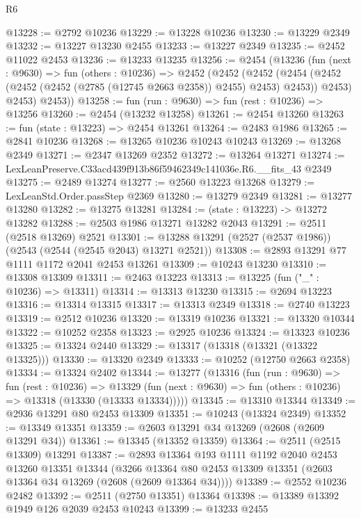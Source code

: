 \begin{lexlean}{R6}
\begin{coremodule}
@13228 := @2792 @10236
@13229 := @13228 @10236
@13230 := @13229 @2349
@13232 := @13227 @13230 @2455
@13233 := @13227 @2349
@13235 := @2452 @11022 @2453
@13236 := @13233 @13235
@13256 := @2454
    (@13236
      (fun (next : @9630) =>
      fun (others : @10236) =>
      @2452
        (@2452
          (@2452
            (@2454 (@2452 (@2452 (@2452 (@2785 (@12745 @2663 @2358)) @2455) @2453) @2453))
            @2453)
          @2453)
        @2453))
@13258 := fun (run : @9630) => fun (rest : @10236) => @13256
@13260 := @2454 (@13232 @13258)
@13261 := @2454 @13260
@13263 := fun (state : @13223) => @2454 @13261
@13264 := @2483 @1986
@13265 := @2841 @10236
@13268 := @13265 @10236 @10243 @10243
@13269 := @13268 @2349
@13271 := @2347 @13269 @2352
@13272 := @13264 @13271
@13274 := LexLeanPreserve.C33acd439f913b86f59462349c141036e.R6.__fits_43 @2349
@13275 := @2489 @13274
@13277 := @2560 @13223 @13268
@13279 := LexLeanStd.Order.passStep @2369
@13280 := @13279 @2349
@13281 := @13277 @13280
@13282 := @13275 @13281
@13284 := (state : @13223) -> @13272 @13282
@13288 := @2503 @1986 @13271 @13282 @2043
@13291 := @2511 (@2518 @13269) @2521
@13301 := @13288 @13291 (@2527 (@2537 @1986)) (@2543 (@2544 (@2545 @2043) @13271 @2521))
@13308 := @2893 @13291 @77 @1111 @1172 @2041 @2453 @13261
@13309 := @10243 @13230
@13310 := @13308 @13309
@13311 := @2463 @13223
@13313 := @13225 (fun ("_" : @10236) => @13311)
@13314 := @13313 @13230
@13315 := @2694 @13223
@13316 := @13314 @13315
@13317 := @13313 @2349
@13318 := @2740 @13223
@13319 := @2512 @10236
@13320 := @13319 @10236
@13321 := @13320 @10344
@13322 := @10252 @2358
@13323 := @2925 @10236
@13324 := @13323 @10236
@13325 := @13324 @2440
@13329 := @13317 (@13318 (@13321 (@13322 @13325)))
@13330 := @13320 @2349
@13333 := @10252 (@12750 @2663 @2358)
@13334 := @13324 @2402
@13344 := @13277
    (@13316
      (fun (run : @9630) =>
      fun (rest : @10236) =>
      @13329 (fun (next : @9630) => fun (others : @10236) => @13318 (@13330 (@13333 @13334)))))
@13345 := @13310 @13344
@13349 := @2936 @13291 @80 @2453 @13309
@13351 := @10243 (@13324 @2349)
@13352 := @13349 @13351
@13359 := @2603 @13291 @34 @13269 (@2608 (@2609 @13291 @34))
@13361 := @13345 (@13352 @13359)
@13364 := @2511 (@2515 @13309) @13291
@13387 := @2893
    @13364
    @193
    @1111
    @1192
    @2040
    @2453
    @13260
    @13351
    @13344
    (@3266 @13364 @80 @2453 @13309 @13351 (@2603 @13364 @34 @13269 (@2608 (@2609 @13364 @34))))
@13389 := @2552 @10236 @2482
@13392 := @2511 (@2750 @13351) @13364
@13398 := @13389 @13392 @1949 @126 @2039 @2453 @10243
@13399 := @13233 @2455

\end{coremodule}
\end{lexlean}
